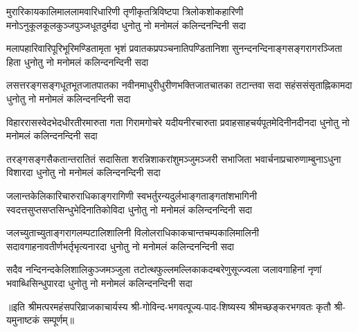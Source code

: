 
\fourlineindentedshloka
{मुरारिकायकालिमाललामवारिधारिणी}
{तृणीकृतत्रिविष्टपा त्रिलोकशोकहारिणी}
{मनोऽनुकूलकूलकुञ्जपुञ्जधूतदुर्मदा}
{धुनोतु नो मनोमलं कलिन्दनन्दिनी सदा}%

\fourlineindentedshloka
{मलापहारिवारिपूरिभूरिमण्डितामृता}
{भृशं प्रवातकप्रपञ्चनातिपण्डितानिशा}
{सुनन्दनन्दिनाङ्गसङ्गरागरञ्जिता हिता}
{धुनोतु नो मनोमलं कलिन्दनन्दिनी सदा}%

\fourlineindentedshloka
{लसत्तरङ्गसङ्गधूतभूतजातपातका}
{नवीनमाधुरीधुरीणभक्तिजातचातका}
{तटान्तवा  सदा  सहंससंसृताह्निकामदा}
{धुनोतु नो मनोमलं कलिन्दनन्दिनी सदा}%

\fourlineindentedshloka
{विहाररासस्वेदभेदधीरतीरमारुता}
{गता गिरामगोचरे यदीयनीरचारुता}
{प्रवाहसाहचर्यपूतमेदिनीनदीनदा}
{धुनोतु नो मनोमलं कलिन्दनन्दिनी सदा}%

\fourlineindentedshloka
{तरङ्गसङ्गसैकतान्तरातितं सदासिता}
{शरन्निशाकरांशुमञ्जुमञ्जरी सभाजिता}
{भवार्चनाप्रचारुणाम्बुनाऽधुना विशारदा}
{धुनोतु नो मनोमलं कलिन्दनन्दिनी सदा}%

\fourlineindentedshloka
{जलान्तकेलिकारिचारुराधिकाङ्गरागिणी}
{स्वभर्तुरन्यदुर्लभाङ्गताङ्गतांशभागिनी}
{स्वदत्तसुप्तसप्तसिन्धुभेदिनातिकोविदा}
{धुनोतु नो मनोमलं कलिन्दनन्दिनी सदा}%

\fourlineindentedshloka
{जलच्युताच्युताङ्गरागलम्पटालिशालिनी}
{विलोलराधिकाकचान्तचम्पकालिमालिनी}
{सदावगाहनावतीर्णभर्तृभृत्यनारदा}
{धुनोतु नो मनोमलं कलिन्दनन्दिनी सदा}%

\fourlineindentedshloka
{सदैव नन्दिनन्दकेलिशालिकुञ्जमञ्जुला}
{तटोत्थफुल्लमल्लिकाकदम्बरेणुसूज्ज्वला}
{जलावगाहिनां नृणां भवाब्धिसिन्धुपारदा}
{धुनोतु नो मनोमलं कलिन्दनन्दिनी सदा}%

॥इति श्रीमत्परमहंसपरिव्राजकाचार्यस्य श्री-गोविन्द-भगवत्पूज्य-पाद-शिष्यस्य
श्रीमच्छङ्करभगवतः कृतौ श्री-यमुनाष्टकं सम्पूर्णम्॥
